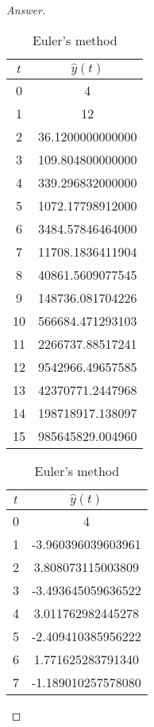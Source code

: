 \begin{proof}[Answer]

\ifnum{}
	\begin{table}[H]
\else
	\begin{table}[htbp]
\fi
	\centering
	\begin{subtable}[t]{0.32\textwidth}
		\centering
		\begin{tabular}[t]{|c|c|}
		\hline
		\(t\)	&	\(\hat{y}(t)\)	\\	\hline
		0	&	4					\\	\hline
		1	&	12					\\	\hline
		2	&	36.1200000000000	\\	\hline
		3	&	109.804800000000	\\	\hline
		4	&	339.296832000000	\\	\hline
		5	&	1072.17798912000	\\	\hline
		6	&	3484.57846464000	\\	\hline
		7	&	11708.1836411904	\\	\hline
		8	&	40861.5609077545	\\	\hline
		9	&	148736.081704226	\\	\hline
		10	&	566684.471293103	\\	\hline
		11	&	2266737.88517241	\\	\hline
		12	&	9542966.49657585	\\	\hline
		13	&	42370771.2447968	\\	\hline
		14	&	198718917.138097	\\	\hline
		15	&	985645829.004960	\\	\hline
		\end{tabular}
		\caption{Euler's method}
	\end{subtable}
	\begin{subtable}[t]{0.32\textwidth}
		\centering
		\begin{tabular}[t]{|c|c|}
		\hline
		\(t\)	&	\(\hat{y}(t)\)	\\	\hline
		0	&	4					\\	\hline
		1	&	-3.960396039603961	\\	\hline
		2	&	3.808073115003809	\\	\hline
		3	&	-3.493645059636522	\\	\hline
		4	&	3.011762982445278	\\	\hline
		5	&	-2.409410385956222	\\	\hline
		6	&	1.771625283791340	\\	\hline
		7	&	-1.189010257578080	\\	\hline

\end{tabular}
\end{subtable}
\end{table}
\end{table}
\end{proof}
